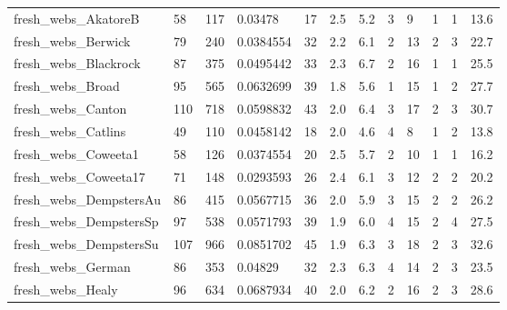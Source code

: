 \begin{longtable}{llllllllllll}
 fresh\_webs\_AkatoreB                                & 58         & 117       & 0.03478     & 17    & 2.5    & 5.2    & 3     & 9      & 1      & 1      & 13.6    \\
 fresh\_webs\_Berwick                                 & 79         & 240       & 0.0384554   & 32    & 2.2    & 6.1    & 2     & 13     & 2      & 3      & 22.7    \\
 fresh\_webs\_Blackrock                               & 87         & 375       & 0.0495442   & 33    & 2.3    & 6.7    & 2     & 16     & 1      & 1      & 25.5    \\
 fresh\_webs\_Broad                                   & 95         & 565       & 0.0632699   & 39    & 1.8    & 5.6    & 1     & 15     & 1      & 2      & 27.7    \\
 fresh\_webs\_Canton                                  & 110        & 718       & 0.0598832   & 43    & 2.0    & 6.4    & 3     & 17     & 2      & 3      & 30.7    \\
 fresh\_webs\_Catlins                                 & 49         & 110       & 0.0458142   & 18    & 2.0    & 4.6    & 4     & 8      & 1      & 2      & 13.8    \\
 fresh\_webs\_Coweeta1                                & 58         & 126       & 0.0374554   & 20    & 2.5    & 5.7    & 2     & 10     & 1      & 1      & 16.2    \\
 fresh\_webs\_Coweeta17                               & 71         & 148       & 0.0293593   & 26    & 2.4    & 6.1    & 3     & 12     & 2      & 2      & 20.2    \\
 fresh\_webs\_DempstersAu                             & 86         & 415       & 0.0567715   & 36    & 2.0    & 5.9    & 3     & 15     & 2      & 2      & 26.2    \\
 fresh\_webs\_DempstersSp                             & 97         & 538       & 0.0571793   & 39    & 1.9    & 6.0    & 4     & 15     & 2      & 4      & 27.5    \\
 fresh\_webs\_DempstersSu                             & 107        & 966       & 0.0851702   & 45    & 1.9    & 6.3    & 3     & 18     & 2      & 3      & 32.6    \\
 fresh\_webs\_German                                  & 86         & 353       & 0.04829     & 32    & 2.3    & 6.3    & 4     & 14     & 2      & 3      & 23.5    \\
 fresh\_webs\_Healy                                   & 96         & 634       & 0.0687934   & 40    & 2.0    & 6.2    & 2     & 16     & 2      & 3      & 28.6    \\

\end{longtable}
